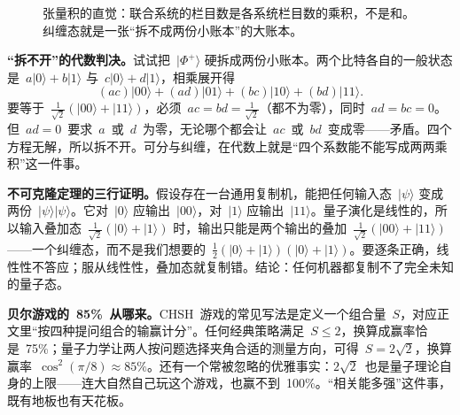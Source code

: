 \begin{figure}[htbp]
\centering
{}
\caption{张量积的直觉：联合系统的栏目数是各系统栏目数的乘积，不是和。纠缠态就是一张“拆不成两份小账本”的大账本。}
\end{figure}

\begin{mathbridge}
\textbf{“拆不开”的代数判决。}试试把~\(|\Phi^{+}\rangle\) 硬拆成两份小账本。两个比特各自的一般状态是~\(a|0\rangle+b|1\rangle\) 与~\(c|0\rangle+d|1\rangle\)，相乘展开得
\[
(ac)|00\rangle+(ad)|01\rangle+(bc)|10\rangle+(bd)|11\rangle .
\]
要等于~\(\tfrac{1}{\sqrt2}(|00\rangle+|11\rangle)\)，必须~\(ac=bd=\tfrac{1}{\sqrt2}\)（都不为零），同时~\(ad=bc=0\)。但~\(ad=0\)~要求~\(a\)~或~\(d\)~为零，无论哪个都会让~\(ac\)~或~\(bd\)~变成零——矛盾。四个方程无解，所以拆不开。可分与纠缠，在代数上就是“四个系数能不能写成两两乘积”这一件事。

\textbf{不可克隆定理的三行证明。}假设存在一台通用复制机，能把任何输入态~\(|\psi\rangle\) 变成两份~\(|\psi\rangle|\psi\rangle\)。它对~\(|0\rangle\) 应输出~\(|00\rangle\)，对~\(|1\rangle\) 应输出~\(|11\rangle\)。量子演化是线性的，所以输入叠加态~\(\tfrac{1}{\sqrt2}(|0\rangle+|1\rangle)\) 时，输出只能是两个输出的叠加~\(\tfrac{1}{\sqrt2}(|00\rangle+|11\rangle)\)——一个纠缠态，而不是我们想要的~\(\tfrac12(|0\rangle+|1\rangle)(|0\rangle+|1\rangle)\)。要逐条正确，线性性不答应；服从线性性，叠加态就复制错。结论：任何机器都复制不了完全未知的量子态。

\textbf{贝尔游戏的~85\%~从哪来。}CHSH~游戏的常见写法是定义一个组合量~\(S\)，对应正文里“按四种提问组合的输赢计分”。任何经典策略满足~\(S\leq2\)，换算成赢率恰是~75\%；量子力学让两人按问题选择夹角合适的测量方向，可得~\(S=2\sqrt2\)，换算赢率~\(\cos^2(\pi/8)\approx85\%\)。还有一个常被忽略的优雅事实：\(2\sqrt2\)~也是量子理论自身的上限——连大自然自己玩这个游戏，也赢不到~100\%。“相关能多强”这件事，既有地板也有天花板。
\end{mathbridge}

